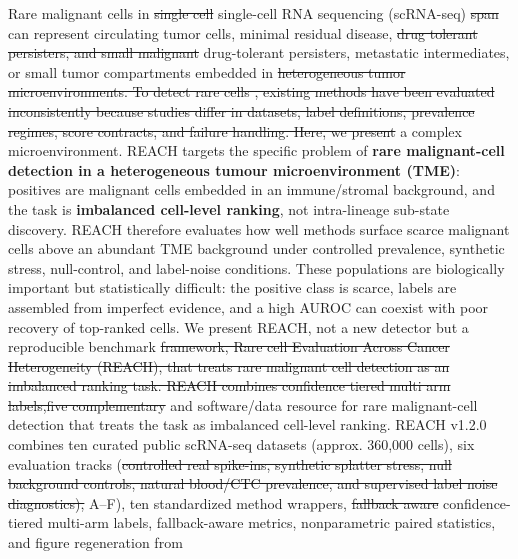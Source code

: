 \documentclass[10pt]{article}
\providecommand{\DIFaddtex}[1]{{\protect\color{trackgreen}#1}} %
\providecommand{\DIFdeltex}[1]{{\protect\color{red}\sout{#1}}}                      %
\providecommand{\DIFaddbegin}{} %
\providecommand{\DIFaddend}{} %
\providecommand{\DIFdelbegin}{} %
\providecommand{\DIFdelend}{} %
\providecommand{\DIFadd}[1]{\texorpdfstring{\DIFaddtex{#1}}{#1}} %
\providecommand{\DIFdel}[1]{\texorpdfstring{\DIFdeltex{#1}}{}} %
\newcommand{\DIFscaledelfig}{0.5}
\newlength{\DIFdelgraphicswidth} %
\newlength{\DIFdelgraphicsheight} %
\newcommand{\DIFaddincludegraphics}[2][]{{\color{trackgreen}\fbox{\DIFOincludegraphics[#1]{#2}}}} %
\newcommand{\DIFdelincludegraphics}[2][]{%
\sbox{\DIFdelgraphicsbox}{\DIFOincludegraphics[#1]{#2}}%
\settoboxwidth{\DIFdelgraphicswidth}{\DIFdelgraphicsbox} %
\settoboxtotalheight{\DIFdelgraphicsheight}{\DIFdelgraphicsbox} %
\scalebox{\DIFscaledelfig}{%
\parbox[b]{\DIFdelgraphicswidth}{\usebox{\DIFdelgraphicsbox}\\[-\baselineskip] \rule{\DIFdelgraphicswidth}{0em}}\llap{\resizebox{\DIFdelgraphicswidth}{\DIFdelgraphicsheight}{%
\setlength{\unitlength}{\DIFdelgraphicswidth}%
\begin{picture}(1,1)%
\thicklines\linethickness{2pt} %
{\color[rgb]{1,0,0}\put(0,0){\framebox(1,1){}}}%
{\color[rgb]{1,0,0}\put(0,0){\line( 1,1){1}}}%
{\color[rgb]{1,0,0}\put(0,1){\line(1,-1){1}}}%
\end{picture}%
}\hspace*{3pt}}} %
} %
\DeclareRobustCommand{\DIFaddbegin}{\DIFOaddbegin \let\includegraphics\DIFaddincludegraphics} %
\DeclareRobustCommand{\DIFaddend}{\DIFOaddend \let\includegraphics\DIFOincludegraphics} %
\DeclareRobustCommand{\DIFdelbegin}{\DIFOdelbegin \let\includegraphics\DIFdelincludegraphics} %
\DeclareRobustCommand{\DIFdelend}{\DIFOaddend \let\includegraphics\DIFOincludegraphics} %
\begin{document}
\DIFaddend Rare malignant cells in \DIFdelbegin \DIFdel{single cell }\DIFdelend \DIFaddbegin \DIFadd{single-cell }\DIFaddend RNA sequencing (scRNA-seq) \DIFdelbegin \DIFdel{span
}\DIFdelend \DIFaddbegin \DIFadd{can
represent }\DIFaddend circulating tumor cells, \DIFaddbegin \DIFadd{minimal }\DIFaddend residual disease,
\DIFdelbegin \DIFdel{drug tolerant persisters, and
small malignant }\DIFdelend \DIFaddbegin \DIFadd{drug-tolerant persisters, metastatic intermediates, or small tumor
}\DIFaddend compartments embedded in \DIFdelbegin \DIFdel{heterogeneous tumor
microenvironments. To detect rare cells , existing methods have been evaluated inconsistently because
studies differ in datasets, label definitions, prevalence regimes, score
contracts, and failure handling.
Here, we present }\DIFdelend \DIFaddbegin \DIFadd{a complex microenvironment. REACH targets the
specific problem of }\textbf{\DIFadd{rare malignant-cell detection in a
heterogeneous tumour microenvironment (TME)}}\DIFadd{: positives are malignant
cells embedded in an immune/stromal background, and the task is
}\textbf{\DIFadd{imbalanced cell-level ranking}}\DIFadd{, not intra-lineage sub-state
discovery. REACH therefore evaluates how well methods surface scarce
malignant cells above an abundant TME background under controlled
prevalence, synthetic stress, null-control, and label-noise conditions.
These populations are biologically important but statistically
difficult: the positive class is scarce, labels are assembled from
imperfect evidence, and a high AUROC can coexist with poor recovery of
top-ranked cells. We present REACH, not a new detector but }\DIFaddend a
reproducible benchmark \DIFdelbegin \DIFdel{framework,  Rare cell Evaluation Across Cancer Heterogeneity (REACH),  that treats rare
malignant cell detection as an
imbalanced ranking task. REACH combines confidence tiered multi arm labels,five complementary }\DIFdelend \DIFaddbegin \DIFadd{and software/data resource for rare
malignant-cell detection that treats the task as imbalanced cell-level
ranking. REACH v1.2.0 combines ten curated public scRNA-seq datasets
(approx. 360,000 cells), six }\DIFaddend evaluation tracks (\DIFdelbegin \DIFdel{controlled real spike-ins, synthetic
splatter stress, null background controls, natural blood/CTC prevalence, and
supervised label noise diagnostics), }\DIFdelend \DIFaddbegin \DIFadd{A--F), ten }\DIFaddend standardized
method wrappers, \DIFdelbegin \DIFdel{fallback aware
}\DIFdelend \DIFaddbegin \DIFadd{confidence-tiered multi-arm labels, fallback-aware
}\DIFaddend metrics, nonparametric \DIFaddbegin \DIFadd{paired }\DIFaddend statistics, and figure regeneration from
\end{document}
